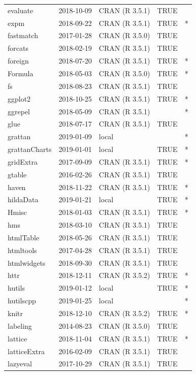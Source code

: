 \documentclass{grattan}\usepackage[]{graphicx}\usepackage[]{color}
\begin{document}
\begin{longtable}{lllll}
  evaluate & 2018-10-09 & CRAN (R 3.5.1) & TRUE &  \\ 
  expm & 2018-09-22 & CRAN (R 3.5.1) & TRUE & * \\ 
  fastmatch & 2017-01-28 & CRAN (R 3.5.0) & TRUE &  \\ 
  forcats & 2018-02-19 & CRAN (R 3.5.1) & TRUE &  \\ 
  foreign & 2018-07-20 & CRAN (R 3.5.1) & TRUE & * \\ 
  Formula & 2018-05-03 & CRAN (R 3.5.0) & TRUE & * \\ 
  fs & 2018-08-23 & CRAN (R 3.5.1) & TRUE &  \\ 
  ggplot2 & 2018-10-25 & CRAN (R 3.5.1) & TRUE & * \\ 
  ggrepel & 2018-05-09 & CRAN (R 3.5.1) &  & * \\ 
  glue & 2018-07-17 & CRAN (R 3.5.1) & TRUE &  \\ 
  grattan & 2019-01-09 & local &  & * \\ 
  grattanCharts & 2019-01-01 & local & TRUE & * \\ 
  gridExtra & 2017-09-09 & CRAN (R 3.5.1) & TRUE & * \\ 
  gtable & 2016-02-26 & CRAN (R 3.5.1) & TRUE &  \\ 
  haven & 2018-11-22 & CRAN (R 3.5.1) & TRUE & * \\ 
  hildaData & 2019-01-21 & local & TRUE & * \\ 
  Hmisc & 2018-01-03 & CRAN (R 3.5.1) & TRUE & * \\ 
  hms & 2018-03-10 & CRAN (R 3.5.1) & TRUE &  \\ 
  htmlTable & 2018-05-26 & CRAN (R 3.5.1) & TRUE &  \\ 
  htmltools & 2017-04-28 & CRAN (R 3.5.1) & TRUE &  \\ 
  htmlwidgets & 2018-09-30 & CRAN (R 3.5.1) & TRUE &  \\ 
  httr & 2018-12-11 & CRAN (R 3.5.2) & TRUE & * \\ 
  hutils & 2019-01-12 & local & TRUE & * \\ 
  hutilscpp & 2019-01-25 & local &  & * \\ 
  knitr & 2018-12-10 & CRAN (R 3.5.2) & TRUE & * \\ 
  labeling & 2014-08-23 & CRAN (R 3.5.0) & TRUE &  \\ 
  lattice & 2018-11-04 & CRAN (R 3.5.1) & TRUE & * \\ 
  latticeExtra & 2016-02-09 & CRAN (R 3.5.1) & TRUE &  \\ 
  lazyeval & 2017-10-29 & CRAN (R 3.5.1) & TRUE &  \\ 

\end{longtable}
\end{document}
